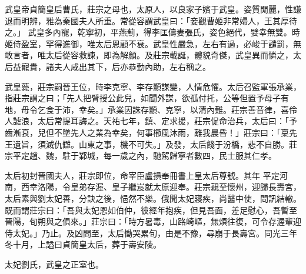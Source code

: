 
\begin{pinyinscope}

 武皇帝貞簡皇后曹氏，莊宗之母也，太原人，以良家子嬪于武皇。姿質閒麗，性謙退而明辨，雅為秦國夫人所重。常從容謂武皇曰：「妾觀曹姬非常婦人，王其厚待之。」
 武皇多內寵，乾寧初，平燕薊，得李匡儔妻張氏，姿色絕代，嬖幸無雙。時姬侍盈室，罕得進御，唯太后恩顧不衰。武皇性嚴急，左右有過，必峻于譴罰，無敢言者，唯太后從容救諫，即為解顏。及莊宗載誕，體貌奇傑，武皇異而憐之，太后益寵貴，諸夫人咸出其下，后亦恭勤內助，左右稱之。



 武皇薨，莊宗嗣晉王位，時李克寧、李存顥謀變，人情危懼。太后召監軍張承業，指莊宗謂之曰；「先人把臂授公此兒，如聞外謀，欲孤付托，公等但置予母子有
 地，毋令乞食于沛，幸矣。」承業因誅存顥、克寧，以清內難。莊宗善音律，喜伶人謔浪，太后常提耳誨之。天祐七年，鎮、定求援，莊宗促命治兵，太后曰：「予齒漸衰，兒但不墜先人之業為幸矣，何事櫛風沐雨，離我晨昏！」莊宗曰：「稟先王遺旨，須滅仇讎。山東之事，機不可失。」及發，太后餞于汾橋，悲不自勝。莊宗平定趙、魏，駐于鄴城，每一歲之內，馳駕歸寧者數四，民士服其仁孝。



 太后初封晉國夫人，莊宗即位，命宰臣盧損奉冊書上皇太后尊號。其年
 平定河南，西幸洛陽，令皇弟存渥、皇子繼岌就太原迎奉。莊宗親至懷州，迎歸長壽宮，太后素與劉太妃善，分訣之後，悒然不樂。俄聞太妃寢疾，尚醫中使，問訊結轍。既而謂莊宗曰：「吾與太妃恩如伯仲，彼經年抱疾，但見吾面，差足慰心，吾暫至晉陽，旬朔與之俱來。」莊宗曰：「時方暑毒，山路崎嶇，無煩往復，可令存渥輩迎侍太妃。」乃止。及凶問至，太后慟哭累旬，由是不豫，尋崩于長壽宮。同光三年冬十月，上謚曰貞簡皇太后，葬于壽安陵。


太妃劉氏，武皇之正室也。




\end{pinyinscope}
